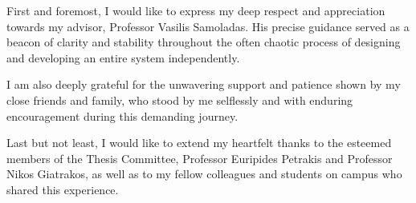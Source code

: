 \documentclass[
	12pt, %
	twoside,
	english,
	onehalfspacing, %
	liststotoc, %
	toctotoc, %
	parskip, %
	headsepline, %
	chapterinoneline, %
]{MastersDoctoralThesis} %
\begin{document}
\begin{acknowledgements}
	\addchaptertocentry{\acknowledgementname} %
	First and foremost, I would like to  express my deep respect and appreciation 
	towards my advisor, Professor Vasilis Samoladas. His precise guidance served 
	as a beacon of clarity and stability throughout the often chaotic process of 
	designing and developing an entire system independently.
	
	I am also deeply grateful for the unwavering support and patience shown by my 
	close friends and family, who stood by me selflessly and with enduring encouragement 
	during this demanding journey.

	Last but not least, I would like to extend my heartfelt thanks to the esteemed members 
	of the Thesis Committee, Professor Euripides Petrakis and Professor Nikos Giatrakos, as well as
	to my fellow colleagues and students on campus who shared this experience.

\end{acknowledgements}


\tableofcontents %
\listoffigures %
\listoftables %
\listofalgorithms%

\end{document}
